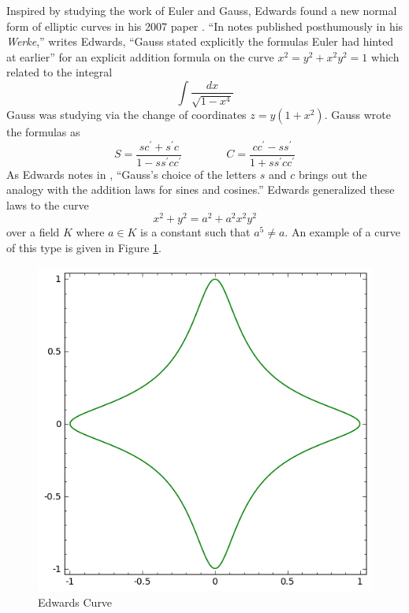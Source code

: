 
Inspired by studying the work of Euler and Gauss, Edwards found a new normal
    form of elliptic curves in his 2007 paper \cite{edwards2007normal}.
``In notes published posthumously in his \textit{Werke},'' writes Edwards,
    ``Gauss stated explicitly the formulas Euler had hinted at earlier'' for an
    explicit addition formula on the curve $x^2 = y^2 + x^2y^2 = 1$ which
    related to the integral 
\[
\int \frac{dx}{\sqrt{1 - x^4}}
\]
    Gauss was studying via the change of coordinates $z = y(1 + x^2)$.
Gauss wrote the formulas as
\[
S = \frac{sc^\prime + s^\prime c}{1 - ss^\prime cc^\prime}
\qquad\qquad
C = \frac{cc^\prime - ss^\prime}{1 + ss^\prime cc^\prime}
\]
As Edwards notes in \cite{edwards2007normal}, ``Gauss's choice of the letters
    $s$ and $c$ brings out the analogy with the addition laws for sines and
    cosines.''
Edwards generalized these laws to the curve
\begin{equation}
\label{eq:Ed1}
x^2 + y^2 = a^2 + a^2x^2y^2
\end{equation}
    over a field $K$ where $a \in K$ is a constant such that $a^5 \ne a$.
An example of a curve of this type is given in Figure \ref{fig:ec1}.
\begin{figure}[htbp]
  \centering
  \includegraphics[scale=0.5]{figures/ec1.png}
  \caption{Edwards Curve}
  \label{fig:ec1}
\end{figure}

